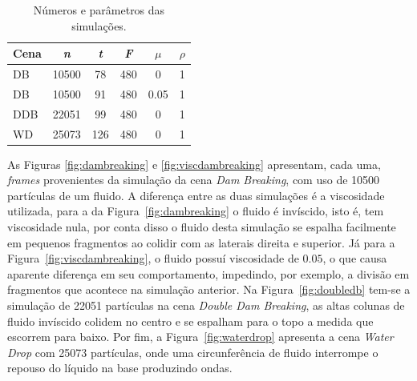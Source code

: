 \documentclass[12pt,a4paper,dvipsnames]{article}
\newcommand{\figref}[1]{Figura~\ref{#1}}
\begin{document}
\begin{table}[ht]
\centering
\begin{tabular}{|l|c|c|c|c|c|}
\hline
Cena & \textit{n} & \textit{t} & \textit{F} & $\mu$ & $\rho$ \\ \hline
DB   & 10500      & 78         & 480        & 0     & 1      \\ \hline
DB   & 10500      & 91         & 480        & 0.05  & 1      \\ \hline
DDB  & 22051      & 99         & 480        & 0     & 1      \\ \hline
WD   & 25073      & 126        & 480        & 0     & 1      \\ \hline
\end{tabular}
\caption{Números e parâmetros das simulações.}
\label{tab:simparams}
\end{table}

As Figuras \ref{fig:dambreaking} e \ref{fig:viscdambreaking} apresentam, cada uma, \textit{frames} provenientes da simulação da cena \textit{Dam Breaking}, com uso de 10500 partículas de um fluido. A diferença entre as duas simulações é a viscosidade utilizada, para a da \figref{fig:dambreaking} o fluido é invíscido, isto é, tem viscosidade nula, por conta disso o fluido desta simulação se espalha facilmente em pequenos fragmentos ao colidir com as laterais direita e superior. Já para a \figref{fig:viscdambreaking}, o fluido possuí viscosidade de $0.05$, o que causa aparente diferença em seu comportamento, impedindo, por exemplo, a divisão em fragmentos que acontece na simulação anterior. Na \figref{fig:doubledb} tem-se a simulação de 22051 partículas na cena \textit{Double Dam Breaking}, as altas colunas de fluido invíscido colidem no centro e se espalham para o topo a medida que escorrem para baixo. Por fim, a \figref{fig:waterdrop} apresenta a cena \textit{Water Drop} com 25073 partículas, onde uma circunferência de fluido interrompe o repouso do líquido na base produzindo ondas.


\clearpage
\end{document}
